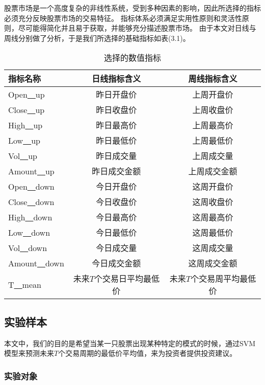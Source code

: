 股票市场是一个高度复杂的非线性系统，受到多种因素的影响，因此所选择的指标必须充分反映股票市场的交易特征。
指标体系必须满足实用性原则和灵活性原则，尽可能得简化并且易于获取，并能够充分描述股票市场。
由于本文对日线与周线分别做了分析，于是我们所选择的基础指标如表(3.1)。
\begin{table}[ht]
    \centering
    \caption{选择的数值指标}
    \begin{tabular}{lcc}
        \hline
        {指标名称} & {日线指标含义} & {周线指标含义}\\
        \hline
        {Open\underline{~~}up} & {昨日开盘价} & {上周开盘价}\\
        {Close\underline{~~}up} & {昨日收盘价} & {上周收盘价}\\
        {High\underline{~~}up} & {昨日最高价} & {上周最高价}\\
        {Low\underline{~~}up} & {昨日最低价} & {上周最低价}\\
        {Vol\underline{~~}up} & {昨日成交量} & {上周成交量}\\
        {Amount\underline{~~}up} & {昨日成交金额} & {上周成交金额}\\
        {Open\underline{~~}down} & {今日开盘价} & {这周开盘价}\\
        {Close\underline{~~}down} & {今日收盘价} & {这周收盘价}\\
        {High\underline{~~}down} & {今日最高价} & {这周最高价}\\
        {Low\underline{~~}down} & {今日最低价} & {这周最低价}\\
        {Vol\underline{~~}down} & {今日成交量} & {这周成交量}\\
        {Amount\underline{~~}down} & {今日成交金额} & {这周成交金额}\\
        {T\underline{~~}mean} & {未来$T$个交易日平均最低价} & {未来$T$个交易周平均最低价}\\
        \hline
    \end{tabular}
\end{table}

\subsection{实验样本}

本文中，我们的目的是希望当某一只股票出现某种特定的模式的时候，通过SVM模型来预测未来$T$个交易周期的最低价平均值，来为投资者提供投资建议。

\subsubsection{实验对象}


